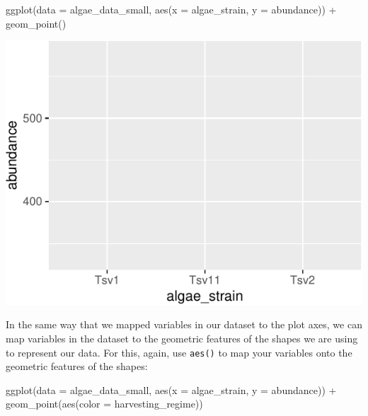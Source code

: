 \documentclass[
]{krantz}
\newenvironment{Shaded}{\begin{snugshade}}{\end{snugshade}}
\newcommand{\AttributeTok}[1]{\textcolor[rgb]{0.77,0.63,0.00}{#1}}
\newcommand{\FunctionTok}[1]{\textcolor[rgb]{0.00,0.00,0.00}{#1}}
\newcommand{\NormalTok}[1]{#1}
\newcommand{\SpecialCharTok}[1]{\textcolor[rgb]{0.00,0.00,0.00}{#1}}
\begin{document}
\begin{Shaded}
\begin{Highlighting}[]
\FunctionTok{ggplot}\NormalTok{(}\AttributeTok{data =}\NormalTok{ algae\_data\_small, }\FunctionTok{aes}\NormalTok{(}\AttributeTok{x =}\NormalTok{ algae\_strain, }\AttributeTok{y =}\NormalTok{ abundance)) }\SpecialCharTok{+}
  \FunctionTok{geom\_point}\NormalTok{()}
\end{Highlighting}
\end{Shaded}

\begin{center}\includegraphics{index_files/figure-latex/unnamed-chunk-22-1} \end{center}

In the same way that we mapped variables in our dataset to the plot axes, we can map variables in the dataset to the geometric features of the shapes we are using to represent our data. For this, again, use \texttt{aes()} to map your variables onto the geometric features of the shapes:

\begin{Shaded}
\begin{Highlighting}[]
\FunctionTok{ggplot}\NormalTok{(}\AttributeTok{data =}\NormalTok{ algae\_data\_small, }\FunctionTok{aes}\NormalTok{(}\AttributeTok{x =}\NormalTok{ algae\_strain, }\AttributeTok{y =}\NormalTok{ abundance)) }\SpecialCharTok{+} 
  \FunctionTok{geom\_point}\NormalTok{(}\FunctionTok{aes}\NormalTok{(}\AttributeTok{color =}\NormalTok{ harvesting\_regime))}
\end{Highlighting}
\end{Shaded}
\end{document}
